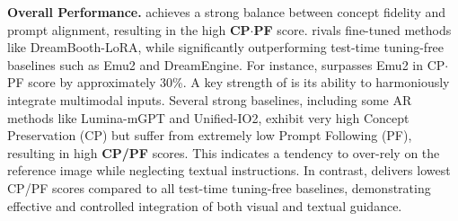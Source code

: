 \textbf{Overall Performance.}
\model achieves a strong balance between concept fidelity and prompt alignment, resulting in the high \textbf{CP$\cdotp$PF} score. 
\model rivals fine-tuned methods like DreamBooth-LoRA, while significantly outperforming test-time tuning-free baselines such as Emu2 and DreamEngine. For instance, \model surpasses Emu2 in CP$\cdotp$PF score by approximately 30\%. 
A key strength of \model is its ability to harmoniously integrate multimodal inputs. Several strong baselines, including some AR methods like Lumina-mGPT and Unified-IO2, exhibit very high Concept Preservation (CP) but suffer from extremely low Prompt Following (PF), resulting in high \textbf{CP/PF} scores. This indicates a tendency to over-rely on the reference image while neglecting textual instructions. In contrast, \model delivers lowest CP/PF scores compared to all test-time tuning-free baselines, demonstrating effective and controlled integration of both visual and textual guidance.


